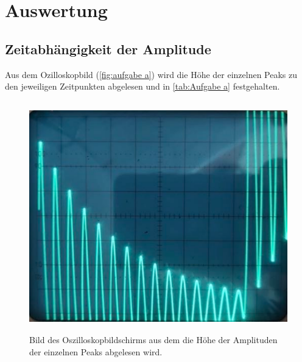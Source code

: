 \section{Auswertung}
\label{sec:Auswertung}

\subsection{Zeitabhängigkeit der Amplitude}
\label{sec:Zeitabhängigkeit der Amplitude}
Aus dem Ozilloskopbild (\autoref{fig:aufgabe a}) wird die Höhe der einzelnen Peaks zu den jeweiligen Zeitpunkten abgelesen 
und in \autoref{tab:Aufgabe a} festgehalten.

\begin{figure} [H]
  \centering
  \includegraphics[height=10cm]{content/Bilder/Aufgabe_a.pdf}
  \caption{Bild des Oszilloskopbildschirms aus dem die Höhe der Amplituden der einzelnen Peaks abgelesen wird.}
  \label{fig:aufgabe a}
\end{figure}

